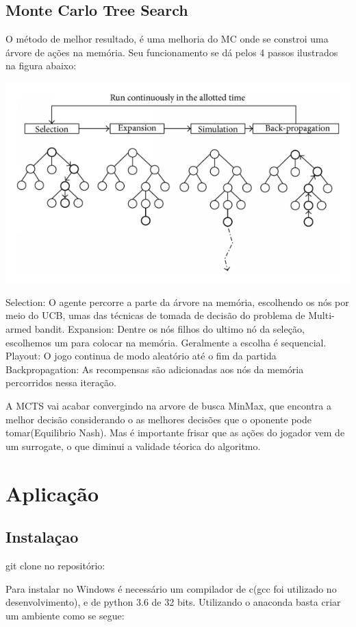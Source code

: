 \documentclass[]{book}
\begin{document}
\section{Monte Carlo Tree Search}\label{monte-carlo-tree-search}

O método de melhor resultado, é uma melhoria do MC onde se constroi uma
árvore de ações na memória. Seu funcionamento se dá pelos 4 passos
ilustrados na figura abaixo:

\begin{center}\includegraphics[width=0.5\linewidth]{content/imgs/MCTS} \end{center}

Selection: O agente percorre a parte da árvore na memória, escolhendo os
nós por meio do UCB, umas das técnicas de tomada de decisão do problema
de Multi-armed bandit. Expansion: Dentre os nós filhos do ultimo nó da
seleção, escolhemos um para colocar na memória. Geralmente a escolha é
sequencial. Playout: O jogo continua de modo aleatório até o fim da
partida Backpropagation: As recompensas são adicionadas aos nós da
memória percorridos nessa iteração.

A MCTS vai acabar convergindo na arvore de busca MinMax, que encontra a
melhor decisão considerando o as melhores decisões que o oponente pode
tomar(Equilibrio Nash). Mas é importante frisar que as ações do jogador
vem de um surrogate, o que diminui a validade téorica do algoritmo.

\chapter{Aplicação}\label{app}

\section{Instalaçao}\label{instalauxe7ao}

git clone no repositório:

Para instalar no Windows é necessário um compilador de c(gcc foi
utilizado no desenvolvimento), e de python 3.6 de 32 bits. Utilizando o
anaconda basta criar um ambiente como se segue:
\end{document}
